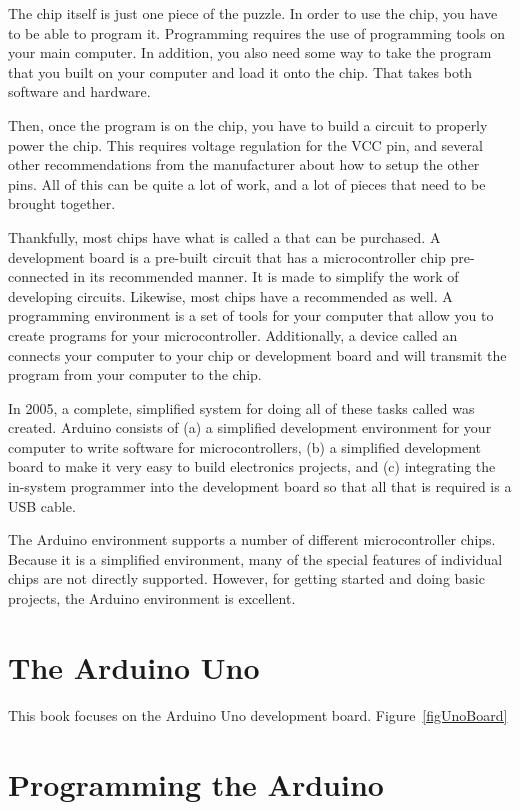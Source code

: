 The chip itself is just one piece of the puzzle.
In order to use the chip, you have to be able to program it.
Programming requires the use of programming tools on your main computer.
In addition, you also need some way to take the program that you built on your computer and load it onto the chip.
That takes both software and hardware.

Then, once the program is on the chip, you have to build a circuit to properly power the chip.
This requires voltage regulation for the VCC pin, and several other recommendations from the manufacturer about how to setup the other pins.  
All of this can be quite a lot of work, and a lot of pieces that need to be brought together.

Thankfully, most chips have what is called a  that can be purchased.
A development board is a pre-built circuit that has a microcontroller chip pre-connected in its recommended manner.
It is made to simplify the work of developing circuits.
Likewise, most chips have a recommended  as well.
A programming environment is a set of tools for your computer that allow you to create programs for your microcontroller.
Additionally, a device called an  connects your computer to your chip or development board and will transmit the program from your computer to the chip.

In 2005, a complete, simplified system for doing all of these tasks called  was created.
Arduino consists of (a) a simplified development environment for your computer to write software for microcontrollers, (b) a simplified development board to make it very easy to build electronics projects, and (c) integrating the in-system programmer into the development board so that all that is required is a USB cable.

The Arduino environment supports a number of different microcontroller chips.
Because it is a simplified environment, many of the special features of individual chips are not directly supported.
However, for getting started and doing basic projects, the Arduino environment is excellent.

\section{The Arduino Uno}

This book focuses on the Arduino Uno development board.
Figure~\ref{figUnoBoard}

\section{Programming the Arduino}
\label{secProgrammingArduino}
